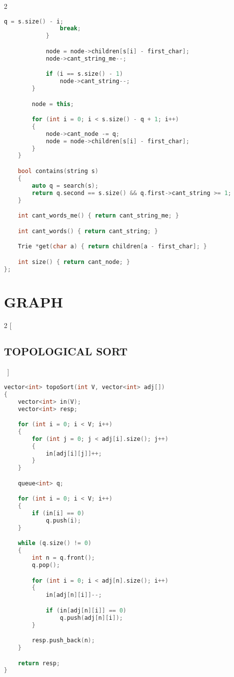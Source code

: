 \documentclass[leter]{amsart}
\begin{document}
\begin{multicols}{2}
\begin{lstlisting}[language=C++]
                q = s.size() - i;
                break;
            }

            node = node->children[s[i] - first_char];
            node->cant_string_me--;

            if (i == s.size() - 1)
                node->cant_string--;
        }

        node = this;

        for (int i = 0; i < s.size() - q + 1; i++)
        {
            node->cant_node -= q;
            node = node->children[s[i] - first_char];
        }
    }

    bool contains(string s)
    {
        auto q = search(s);
        return q.second == s.size() && q.first->cant_string >= 1;
    }

    int cant_words_me() { return cant_string_me; }

    int cant_words() { return cant_string; }

    Trie *get(char a) { return children[a - first_char]; }

    int size() { return cant_node; }
};

\end{lstlisting}
\end{multicols}
\enlargethispage*{\baselineskip}\section{GRAPH}
\begin{multicols}{2}
[\subsection{TOPOLOGICAL SORT}\ ]
\begin{lstlisting}[language=C++]
vector<int> topoSort(int V, vector<int> adj[])
{
    vector<int> in(V);
    vector<int> resp;

    for (int i = 0; i < V; i++)
    {
        for (int j = 0; j < adj[i].size(); j++)
        {
            in[adj[i][j]]++;
        }
    }

    queue<int> q;

    for (int i = 0; i < V; i++)
    {
        if (in[i] == 0)
            q.push(i);
    }

    while (q.size() != 0)
    {
        int n = q.front();
        q.pop();

        for (int i = 0; i < adj[n].size(); i++)
        {
            in[adj[n][i]]--;

            if (in[adj[n][i]] == 0)
                q.push(adj[n][i]);
        }

        resp.push_back(n);
    }

    return resp;
}

\end{lstlisting}
\end{multicols}
\end{document}
